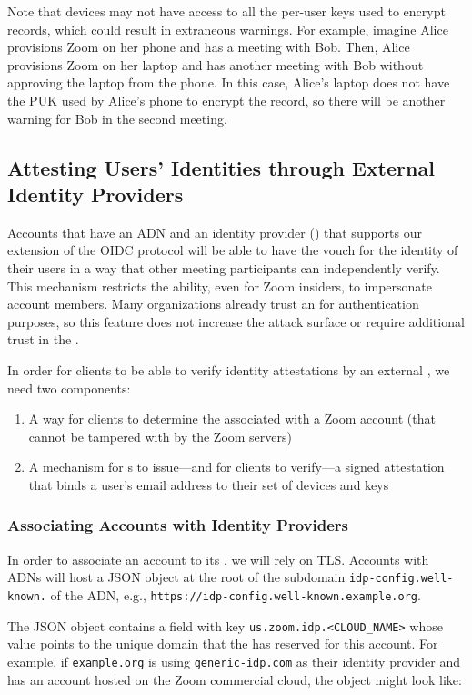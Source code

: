 Note that devices may not have access to all the per-user keys used to encrypt records, which could
result in extraneous warnings. For example, imagine Alice provisions Zoom on her phone and has a
meeting with Bob. Then, Alice provisions Zoom on her laptop and has another meeting with Bob without
approving the laptop from the phone. In this case, Alice's laptop does not have the PUK used by
Alice's phone to encrypt the record, so there will be another warning for Bob in the second meeting.

\subsection{Attesting Users' Identities through External Identity Providers}

Accounts that have an ADN and an identity provider (\idp) that supports our extension of the OIDC
protocol will be able to have the \idp vouch for the identity of their users in a way that other
meeting participants can independently verify. This mechanism restricts the ability, even for Zoom
insiders, to impersonate account members. Many organizations already trust an \idp for
authentication purposes, so this feature does not increase the attack surface or require additional
trust in the \idp.

In order for clients to be able to verify identity attestations by an external \idp, we need two
components:

\begin{enumerate}
\item A way for clients to determine the \idp associated with a Zoom account (that cannot be
    tampered with by the Zoom servers)
\item A mechanism for {\idp}s to issue---and for clients to verify---a signed attestation that binds
    a user's email address to their set of devices and keys
\end{enumerate}

\subsubsection{Associating Accounts with Identity Providers}
\label{subsec:adnToIdp}
In order to associate an account to its \idp, we will rely on TLS\@. Accounts with ADNs will
host a JSON object at the root of the subdomain \texttt{idp-config.well-known.} of
the ADN, e.g., \texttt{https://idp-config.well-known.example.org}.

The JSON object contains a field with key \texttt{us.zoom.idp.<CLOUD\_NAME>} whose value points to the unique domain
that the \idp has reserved for this account. For example, if \texttt{example.org} is using \texttt{generic-idp.com} as
their identity provider and has an account hosted on the Zoom commercial cloud, the object might look like:

